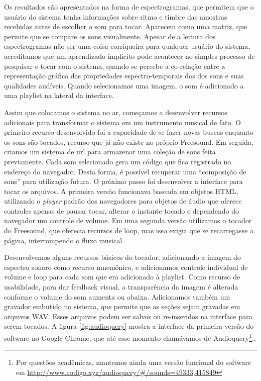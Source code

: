 Os resultados são apresentados na forma de espectrogramas, que permitem que o usuário do sistema tenha informações sobre ritmo e timbre das amostras recebidas antes de escolher o som para tocar. Aparecem como uma matriz, que permite que se compare os sons visualmente. Apesar de a leitura dos espectrogramas não ser uma coisa corriqueira para qualquer usuário do sistema, acreditamos que um aprendizado implícito pode acontecer no simples processo de pesquisar e tocar com o sistema, quando se percebe a co-relação entre a representação gráfica das propriedades espectro-temporais dos dos sons e suas qualidades audíveis. Quando selecionamos uma imagem, o som é adicionado a uma playlist na lateral da interface.

 Assim que colocamos o sistema no ar, começamos a desenvolver recursos adicionais para transformar o sistema em um instrumento musical de fato. O primeiro recurso desenvolvido foi a capacidade de se fazer novas buscas enquanto os sons são tocados, recurso que já não existe no próprio Freesound. Em seguida, criamos um sistema de url para armazenar uma coleção de sons feita previamente. Cada som selecionado gera um código que fica registrado no endereço do navegador. Desta forma, é possível recuperar uma ``composição de sons'' para utilização futura. O próximo passo foi desenvolver a interface para tocar os arquivos. A primeira versão funcionava baseada em objetos HTML, utilizando o \emph{player} padrão dos navegadores para objetos de áudio que oferece controles apenas de pausar tocar, alterar o instante tocado e dependendo do navegador um controle de volume. Em uma segunda versão utilizamos o tocador do Freesound, que oferecia recursos de loop, mas isso exigia que se recarregasse a página, interrompendo o fluxo musical. 

 Desenvolvemos alguns recursos básicos do tocador, adicionando a imagem do espectro sonoro como recurso mnemônico, e adicionamos controle individual de volume e loop para cada som que era adicionado à playlist. Como recurso de usabilidade, para dar feedback visual, a transparência da imagem é alterada conforme o volume do som aumenta ou abaixa. Adicionamos também um gravador embutido no sistema, que permite que as seções sejam gravadas em arquivos WAV. Esses arquivos podem ser salvos ou re-inseridos na interface para serem tocados. A figura \ref{fig:audioquery} mostra a interface da primeira versão do software no Google Chrome, que até esse momento chamávamos de Audioquery\footnote{Por questões acadêmicas, mantemos ainda uma versão funcional do software em \url{http://www.codigo.xyz/audioquery/\#/sounds=49333,415849}}..

